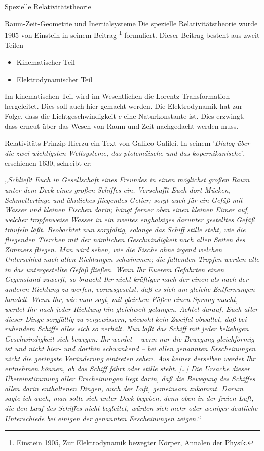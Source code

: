 \def\titlestr{Spezielle Relativitätstheorie}
\ifx\makebook\undefined
	
\else
	\begin{chapter}{\titlestr}
\fi
\begin{section}{Raum-Zeit-Geometrie und Inertialsysteme}
Die spezielle Relativitätstheorie wurde 1905 von Einstein in seinem Beitrag \footnote{Einstein 1905, Zur Elektrodynamik bewegter Körper, Annalen der Physik.} formuliert. Dieser Beitrag besteht aus zweit Teilen
\begin{itemize}
	\item Kinematischer Teil
	\item Elektrodynamischer Teil
\end{itemize}
Im kinematischen Teil wird im Wesentlichen die Lorentz-Transformation hergeleitet. Dies soll auch hier gemacht werden.
Die Elektrodynamik hat zur Folge, dass die Lichtgeschwindigkeit $c$ eine Naturkonstante ist. Dies erzwingt, dass erneut über das Wesen von Raum und Zeit nachgedacht werden muss.

\begin{subsection}{Relativitäts-Prinzip}
Hierzu ein Text von Galileo Galilei. In seinem '\textit{Dialog über die zwei wichtigsten Weltsysteme, das ptolemäische und das kopernikanische}', erschienen 1630, schreibt er:

„\textit{Schließt Euch in Gesellschaft eines Freundes in einen möglichst großen Raum unter dem Deck eines großen Schiffes ein. Verschafft Euch dort Mücken, Schmetterlinge und ähnliches fliegendes Getier; sorgt auch für ein Gefäß mit Wasser und kleinen Fischen darin; hängt ferner oben einen kleinen Eimer auf, welcher tropfenweise Wasser in ein zweites enghalsiges darunter gestelltes Gefäß träufeln läßt. Beobachtet nun sorgfältig, solange das Schiff stille steht, wie die fliegenden Tierchen mit der nämlichen Geschwindigkeit nach allen Seiten des Zimmers fliegen. Man wird sehen, wie die Fische ohne irgend welchen Unterschied nach allen Richtungen schwimmen; die fallenden Tropfen werden alle in das untergestellte Gefäß fließen. Wenn Ihr Euerem Gefährten einen Gegenstand zuwerft, so braucht Ihr nicht kräftiger nach der einen als nach der anderen Richtung zu werfen, vorausgesetzt, daß es sich um gleiche Entfernungen handelt. Wenn Ihr, wie man sagt, mit gleichen Füßen einen Sprung macht, werdet Ihr nach jeder Richtung hin gleichweit gelangen. Achtet darauf, Euch aller dieser Dinge sorgfältig zu vergewissern, wiewohl kein Zweifel obwaltet, daß bei ruhendem Schiffe alles sich so verhält. Nun laßt das Schiff mit jeder beliebigen Geschwindigkeit sich bewegen: Ihr werdet – wenn nur die Bewegung gleichförmig ist und nicht hier- und dorthin schwankend – bei allen genannten Erscheinungen nicht die geringste Veränderung eintreten sehen. Aus keiner derselben werdet Ihr entnehmen können, ob das Schiff fährt oder stille steht. […] Die Ursache dieser Übereinstimmung aller Erscheinungen liegt darin, daß die Bewegung des Schiffes allen darin enthaltenen Dingen, auch der Luft, gemeinsam zukommt. Darum sagte ich auch, man solle sich unter Deck begeben, denn oben in der freien Luft, die den Lauf des Schiffes nicht begleitet, würden sich mehr oder weniger deutliche Unterschiede bei einigen der genannten Erscheinungen zeigen.}“


\end{subsection}
\end{section}
\end{chapter}
